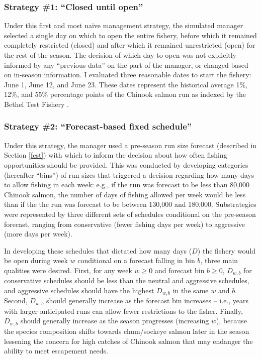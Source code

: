 \documentclass[12pt,]{book}
\theoremstyle{definition}
\theoremstyle{definition}
\theoremstyle{definition}
\theoremstyle{remark}
\begin{document}
\subsubsection{\texorpdfstring{Strategy \#1: ``Closed until
open''}{Strategy \#1: Closed until open}}\label{strategy-1-closed-until-open}

\noindent
Under this first and most naïve management strategy, the simulated
manager selected a single day on which to open the entire fishery,
before which it remained completely restricted (closed) and after which
it remained unrestricted (open) for the rest of the season. The decision
of which day to open was not explicitly informed by any ``previous
data'' on the part of the manager, or changed based on in-season
information. I evaluated three reasonable dates to start the fishery:
June 1, June 12, and June 23. These dates represent the historical
average 1\%, 12\%, and 55\% percentage points of the Chinook salmon run
as indexed by the Bethel Test Fishery \citep{bue-lipka-2016}.

\subsubsection{\texorpdfstring{Strategy \#2: ``Forecast-based fixed
schedule''}{Strategy \#2: Forecast-based fixed schedule}}\label{strategy-2-forecast-based-fixed-schedule}

\noindent
Under this strategy, the manager used a pre-season run size forecast
(described in Section \ref{fcst}) with which to inform the decision
about how often fishing opportunities should be provided. This was
conducted by developing categories (hereafter ``bins'') of run sizes
that triggered a decision regarding how many days to allow fishing in
each week: e.g., if the run was forecast to be less than 80,000 Chinook
salmon, the number of days of fishing allowed per week would be less
than if the the run was forecast to be between 130,000 and 180,000.
Substrategies were represented by three different sets of schedules
conditional on the pre-season forecast, ranging from conservative (fewer
fishing days per week) to aggressive (more days per week).

In developing these schedules that dictated how many days (\(D\)) the
fishery would be open during week \(w\) conditional on a forecast
falling in bin \(b\), three main qualities were desired. First, for any
week \(w \ge 0\) and forecast bin \(b \ge 0\), \(D_{w,b}\) for
conservative schedules should be less than the neutral and aggressive
schedules, and aggressive schedules should have the highest \(D_{w,b}\)
in the same \(w\) and \(b\). Second, \(D_{w,b}\) should generally
increase as the forecast bin increases -- i.e., years with larger
anticipated runs can allow fewer restrictions to the fisher. Finally,
\(D_{w,b}\) should generally increase as the season progresses
(increasing \(w\)), because the species composition shifts towards
chum/sockeye salmon later in the season lessening the concern for high
catches of Chinook salmon that may endanger the ability to meet
escapement needs.
\end{document}
